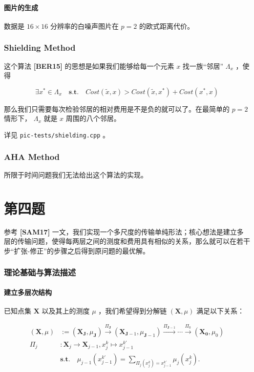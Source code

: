 \documentclass[]{article}
\begin{document}
\subsection{图片的生成}

数据是 \( 16 \times 16\) 分辨率的白噪声图片在 \(p=2\) 的欧式距离代价。

\section{Shielding Method}

这个算法 \textbf{{[}BER15{]}} 的思想是如果我们能够给每一个元素 \(x\)
找一族``邻居'' \(\Lambda_x\) ，使得

\[\exists x^* \in \Lambda_x \quad \textbf{s.t.} \quad Cost(\tilde{x}, x) > Cost(\tilde{x}, x^*) + Cost(x^*, x)\]

那么我们只需要每次检验邻居的相对费用是不是负的就可以了。在最简单的
\(p=2\) 情形下， \(\Lambda_x\) 就是 \(x\) 周围的八个邻居。

详见 \texttt{pic-tests/shielding.cpp} 。

\section{AHA Method}

所限于时间问题我们无法给出这个算法的实现。

\part{第四题}

参考 \textbf{{[}SAM17{]}}
一文，我们实现一个多尺度的传输单纯形法；核心想法是建立多层的传输问题，使得每两层之间的测度和费用具有相似的关系，那么就可以在若干步``扩张-修正''的步骤之后得到原问题的最优解。

\section{理论基础与算法描述}
\subsection{建立多层次结构}

已知点集 \(\mathbf{X}\) 以及其上的测度 \(\mu\) ，我们希望得到分解链
\((\mathbf{X}, \mu)\) 满足以下关系：

\begin{align*}
(\mathbf{X}, \mu) &:= (\mathbf{X_J}, \mu_\mathbf{J}) \xrightarrow{\Pi_{\mathbf{J}}} (\mathbf{X}_{\mathbf{J}-1}, \mu_{\mathbf{J}-1}) \xrightarrow{\Pi_{\mathbf{J}-1}} \cdots \xrightarrow{\Pi_0} (\mathbf{X_0}, \mu_0) \\
\Pi_j&:\mathbf{X}_j \rightarrow \mathbf{X}_{j-1}, x_j^k \mapsto x_{j-1}^{k'} \\
& \textbf{s.t.} \quad\mu_{j-1}(x_{j-1}^{k'}) = \sum_{\Pi_j(x_j^k)=x_{j-1}^{k'}} \mu_j(x_j^k).
\end{align*}
\end{document}
